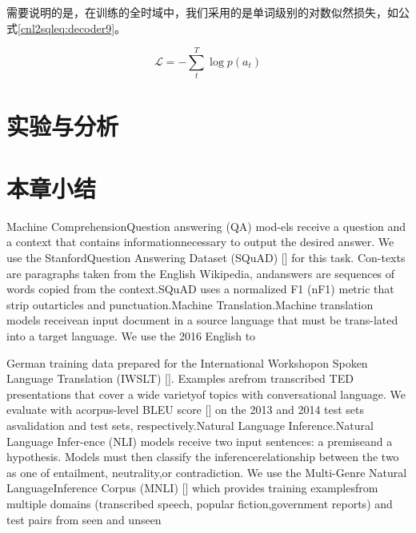 需要说明的是，在训练的全时域中，我们采用的是单词级别的对数似然损失，如公式\ref{cnl2sqleq:decoder9}。

\begin{equation}
  \label{cnl2sqleq:decoder9}
  \mathcal L = -\sum^T_t \log p(a_t)
\end{equation}























\section{实验与分析}
\label{cnl2sql:syyfx}
\section{本章小结}
Machine  ComprehensionQuestion answering (QA) mod-els receive a question and a context that contains informationnecessary  to  output  the  desired  answer.  We  use  the  StanfordQuestion  Answering  Dataset  (SQuAD)  []  for  this  task.  Con-texts  are  paragraphs  taken  from  the  English  Wikipedia,  andanswers  are  sequences  of  words  copied  from  the  context.SQuAD  uses  a  normalized  F1  (nF1)  metric  that  strip  outarticles and punctuation.Machine Translation.Machine translation models receivean  input  document  in  a  source  language  that  must  be  trans-lated  into  a  target  language.  We  use  the  2016  English  to

German training data prepared for the International Workshopon  Spoken  Language  Translation  (IWSLT)  [].  Examples  arefrom transcribed TED presentations that cover a wide varietyof  topics  with  conversational  language.  We  evaluate  with  acorpus-level BLEU score [] on the 2013 and 2014 test sets asvalidation and test sets, respectively.Natural  Language  Inference.Natural  Language  Infer-ence  (NLI)  models  receive  two  input  sentences:  a  premiseand  a  hypothesis.  Models  must  then  classify  the  inferencerelationship between the two as one of entailment, neutrality,or  contradiction.  We  use  the  Multi-Genre  Natural  LanguageInference Corpus (MNLI) [] which provides training examplesfrom  multiple  domains  (transcribed  speech,  popular  fiction,government  reports)  and  test  pairs  from  seen  and  unseen

